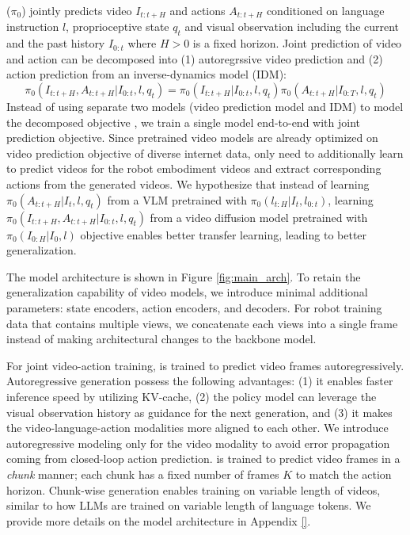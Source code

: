 \ourmethod ($\pi_0$) jointly predicts video $I_{t:t+H}$ and actions $A_{t:t+H}$ conditioned on language instruction $l$, proprioceptive state $q_t$ and visual observation including the current and the past history $I_{0:t}$ where $H>0$ is a fixed horizon. Joint prediction of video and action can be decomposed into (1) autoregrssive video prediction and (2) action prediction from an inverse-dynamics model (IDM): 
\begin{equation}
    \pi_0(I_{t:t+H}, A_{t:t+H} | I_{0:t}, l, q_t) = \pi_0(I_{t:t+H} | I_{0:t}, l, q_t) \pi_0(A_{t:t+H} | I_{0:T}, l, q_t) 
\label{eq:joint_pred}
\end{equation}
Instead of using separate two models (video prediction model and IDM) to model the decomposed objective \citep{pai2025mimic}, we train a single model end-to-end with joint prediction objective. Since pretrained video models are already optimized on video prediction objective of diverse internet data, \ourmethod only need to additionally learn to predict videos for the robot embodiment videos and extract corresponding actions from the generated videos. We hypothesize that instead of learning $\pi_0(A_{t:t+H}| I_t, l, q_t)$ from a VLM pretrained with $\pi_0(l_{t:H}|I_t, l_{0:t})$, learning $\pi_0(I_{t:t+H}, A_{t:t+H} | I_{0:t}, l, q_t)$ from a video diffusion model pretrained with $\pi_0(I_{0:H} | I_0, l)$ objective enables better transfer learning, leading to better generalization.

The model architecture is shown in Figure \ref{fig:main_arch}. To retain the generalization capability of video models, we introduce minimal additional parameters: state encoders, action encoders, and decoders. For robot training data that contains multiple views, we concatenate each views into a single frame instead of making architectural changes to the backbone model. 

For joint video-action training, \ourmethod is trained to predict video frames autoregressively. Autoregressive generation possess the following advantages: (1) it enables faster inference speed by utilizing KV-cache, (2) the policy model can leverage the visual observation history as guidance for the next generation, and (3) it makes the video-language-action modalities more aligned to each other. We introduce autoregressive modeling only for the video modality to avoid error propagation coming from closed-loop action prediction. \ourmethod is trained to predict video frames in a \textit{chunk} manner; each chunk has a fixed number of frames $K$ to match the action horizon. Chunk-wise generation enables training on variable length of videos, similar to how LLMs are trained on variable length of language tokens. We provide more details on the model architecture in Appendix \ref{}.

